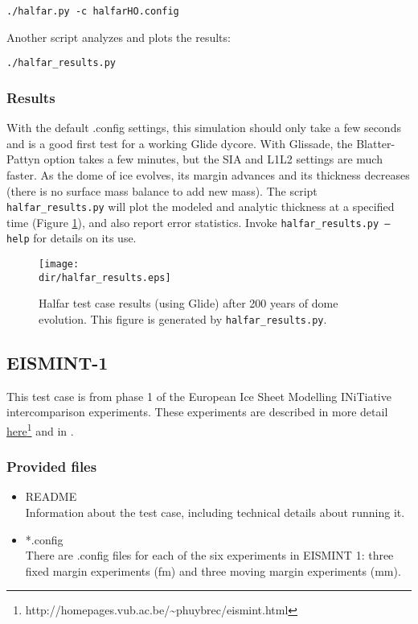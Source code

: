 \texttt{./halfar.py -c halfarHO.config}

Another script analyzes and plots the results:

\texttt{./halfar\_results.py}

\subsubsection{Results}
\label{subsecc:halfar_results}
With the default .config settings, this simulation should only take a few seconds and is a good first test for a working Glide dycore.
With Glissade, the Blatter-Pattyn option takes a few minutes, but the SIA and L1L2 settings are much faster.
As the dome of ice evolves, its margin advances and its thickness decreases (there is no surface mass balance to add new mass).  
The script \texttt{halfar\_results.py} will plot the modeled and analytic thickness at a specified time (Figure \ref{fig:halfarresults}), 
and also report error statistics.  Invoke \texttt{halfar\_results.py --help} for details on its use.

\begin{figure}[H]
	\centering
	\texttt{[image: \\dir/halfar\_results.eps]}
	\caption{Halfar test case results (using Glide) after 200 years of dome evolution. This figure is generated by \texttt{halfar\_results.py}.}
	\label{fig:halfarresults}
\end{figure}


\FloatBarrier


\subsection{EISMINT-1}
\label{sec:eismint_description}
This test case is from phase 1 of the European Ice Sheet Modelling INiTiative intercomparison experiments.  These experiments are described in more detail
\href{http://homepages.vub.ac.be/~phuybrec/eismint.html}{here}\footnote{http://homepages.vub.ac.be/\textasciitilde{}phuybrec/eismint.html} and in \citet{Huybrechts1996}.

\subsubsection{Provided files}
\label{subsec:eismint_files}

\begin{itemize}
	\item README \\
	Information about the test case, including technical details about running it.
	\item *.config \\
  	There are .config files for each of the six experiments in EISMINT 1: three fixed margin experiments (fm) and three moving margin experiments (mm).
\end{itemize}

